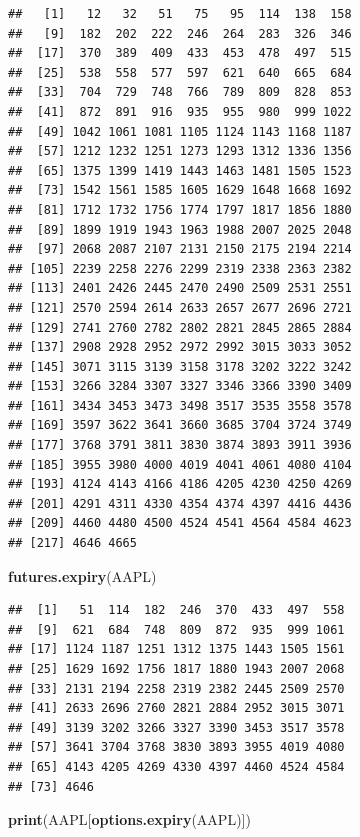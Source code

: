 \documentclass[]{ctexbook}
\newenvironment{Shaded}{\begin{snugshade}}{\end{snugshade}}
\newcommand{\FunctionTok}[1]{\textcolor[rgb]{0.13,0.29,0.53}{\textbf{#1}}}
\newcommand{\NormalTok}[1]{#1}
\begin{document}
\begin{verbatim}
##   [1]   12   32   51   75   95  114  138  158
##   [9]  182  202  222  246  264  283  326  346
##  [17]  370  389  409  433  453  478  497  515
##  [25]  538  558  577  597  621  640  665  684
##  [33]  704  729  748  766  789  809  828  853
##  [41]  872  891  916  935  955  980  999 1022
##  [49] 1042 1061 1081 1105 1124 1143 1168 1187
##  [57] 1212 1232 1251 1273 1293 1312 1336 1356
##  [65] 1375 1399 1419 1443 1463 1481 1505 1523
##  [73] 1542 1561 1585 1605 1629 1648 1668 1692
##  [81] 1712 1732 1756 1774 1797 1817 1856 1880
##  [89] 1899 1919 1943 1963 1988 2007 2025 2048
##  [97] 2068 2087 2107 2131 2150 2175 2194 2214
## [105] 2239 2258 2276 2299 2319 2338 2363 2382
## [113] 2401 2426 2445 2470 2490 2509 2531 2551
## [121] 2570 2594 2614 2633 2657 2677 2696 2721
## [129] 2741 2760 2782 2802 2821 2845 2865 2884
## [137] 2908 2928 2952 2972 2992 3015 3033 3052
## [145] 3071 3115 3139 3158 3178 3202 3222 3242
## [153] 3266 3284 3307 3327 3346 3366 3390 3409
## [161] 3434 3453 3473 3498 3517 3535 3558 3578
## [169] 3597 3622 3641 3660 3685 3704 3724 3749
## [177] 3768 3791 3811 3830 3874 3893 3911 3936
## [185] 3955 3980 4000 4019 4041 4061 4080 4104
## [193] 4124 4143 4166 4186 4205 4230 4250 4269
## [201] 4291 4311 4330 4354 4374 4397 4416 4436
## [209] 4460 4480 4500 4524 4541 4564 4584 4623
## [217] 4646 4665
\end{verbatim}

\begin{Shaded}
\begin{Highlighting}[]
\FunctionTok{futures.expiry}\NormalTok{(AAPL)}
\end{Highlighting}
\end{Shaded}

\begin{verbatim}
##  [1]   51  114  182  246  370  433  497  558
##  [9]  621  684  748  809  872  935  999 1061
## [17] 1124 1187 1251 1312 1375 1443 1505 1561
## [25] 1629 1692 1756 1817 1880 1943 2007 2068
## [33] 2131 2194 2258 2319 2382 2445 2509 2570
## [41] 2633 2696 2760 2821 2884 2952 3015 3071
## [49] 3139 3202 3266 3327 3390 3453 3517 3578
## [57] 3641 3704 3768 3830 3893 3955 4019 4080
## [65] 4143 4205 4269 4330 4397 4460 4524 4584
## [73] 4646
\end{verbatim}

\begin{Shaded}
\begin{Highlighting}[]
\FunctionTok{print}\NormalTok{(AAPL[}\FunctionTok{options.expiry}\NormalTok{(AAPL)])}
\end{Highlighting}
\end{Shaded}
\end{document}
